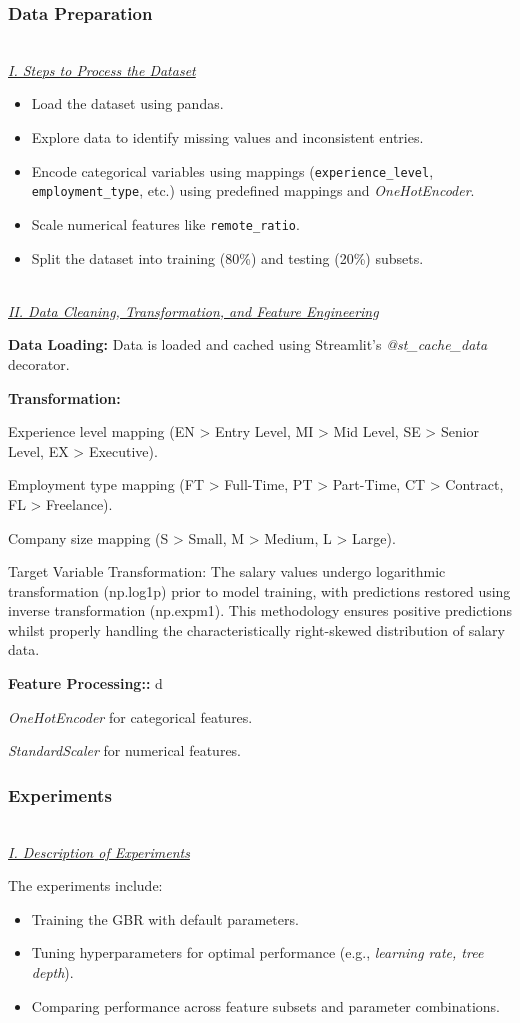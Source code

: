\documentclass[11pt,a4paper]{article}
\newcommand{\SubItem}[1]{
  {\setlength\itemindent{13pt} \item[◦] #1}
}
\newcommand{\subsubsubsection}[1]{
  {\setlength\itemindent{13pt} \textit{\uline{\\#1\\}}} 
}
\begin{document}
\subsubsection{Data Preparation}
\subsubsubsection{I. Steps to Process the Dataset}
\begin{itemize}
\item Load the dataset using pandas.
\item Explore data to identify missing values and inconsistent entries.
\item Encode categorical variables using mappings (\texttt{experience\_level}, \texttt{employment\_type}, etc.) using predefined mappings and \textit{OneHotEncoder}.
\item Scale numerical features like \texttt{remote\_ratio}.
\item Split the dataset into training (80\%) and testing (20\%) subsets.
\end{itemize}

\subsubsubsection{II. Data Cleaning, Transformation, and Feature Engineering}
\begin{itemize}
\item \textbf{Data Loading:} Data is loaded and cached using Streamlit's \textit{@st\_cache\_data} decorator.
\item \textbf{Transformation:}
\SubItem{Experience level mapping (EN > Entry Level, MI > Mid Level, SE > Senior Level, EX > Executive).}
\SubItem{Employment type mapping (FT > Full-Time, PT > Part-Time, CT > Contract, FL > Freelance).}
\SubItem{Company size mapping (S > Small, M > Medium, L > Large).}
\SubItem{Target Variable Transformation: The salary values undergo logarithmic transformation (np.log1p) prior to model training, with predictions restored using inverse transformation (np.expm1). This methodology ensures positive predictions whilst properly handling the characteristically right-skewed distribution of salary data.}
\item \textbf{Feature Processing::} d
\SubItem{\textit{OneHotEncoder} for categorical features.}
\SubItem{\textit{StandardScaler} for numerical features.}
\end{itemize}

\subsubsection{Experiments}
\subsubsubsection{I. Description of Experiments}
The experiments include:
\begin{itemize}
\item Training the GBR with default parameters.
\item Tuning hyperparameters for optimal performance (e.g., \textit{learning rate, tree depth}).
\item Comparing performance across feature subsets and parameter combinations.
\end{itemize}
\end{document}
